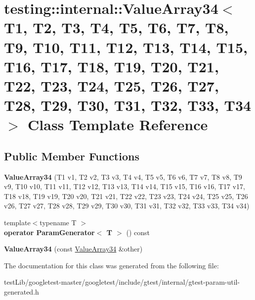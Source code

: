 \hypertarget{classtesting_1_1internal_1_1ValueArray34}{}\section{testing\+:\+:internal\+:\+:Value\+Array34$<$ T1, T2, T3, T4, T5, T6, T7, T8, T9, T10, T11, T12, T13, T14, T15, T16, T17, T18, T19, T20, T21, T22, T23, T24, T25, T26, T27, T28, T29, T30, T31, T32, T33, T34 $>$ Class Template Reference}
\label{classtesting_1_1internal_1_1ValueArray34}
\subsection*{Public Member Functions}
\begin{DoxyCompactItemize}
\item 
\mbox{\label{classtesting_1_1internal_1_1ValueArray34_a25aad9698b9d6fd45743dc86f973be09}} 
{\bfseries Value\+Array34} (T1 v1, T2 v2, T3 v3, T4 v4, T5 v5, T6 v6, T7 v7, T8 v8, T9 v9, T10 v10, T11 v11, T12 v12, T13 v13, T14 v14, T15 v15, T16 v16, T17 v17, T18 v18, T19 v19, T20 v20, T21 v21, T22 v22, T23 v23, T24 v24, T25 v25, T26 v26, T27 v27, T28 v28, T29 v29, T30 v30, T31 v31, T32 v32, T33 v33, T34 v34)
\item 
\mbox{\label{classtesting_1_1internal_1_1ValueArray34_a810547b4fed5bd0e5ed636272ad279b4}} 
{\footnotesize template$<$typename T $>$ }\\{\bfseries operator Param\+Generator$<$ T $>$} () const
\item 
\mbox{\label{classtesting_1_1internal_1_1ValueArray34_aaa146943f507ec601268c5cac4f402a7}} 
{\bfseries Value\+Array34} (const \hyperlink{classtesting_1_1internal_1_1ValueArray34}{Value\+Array34} \&other)
\end{DoxyCompactItemize}


The documentation for this class was generated from the following file\+:\begin{DoxyCompactItemize}
\item 
test\+Lib/googletest-\/master/googletest/include/gtest/internal/gtest-\/param-\/util-\/generated.\+h\end{DoxyCompactItemize}
